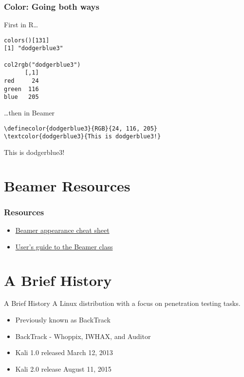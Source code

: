 \documentclass[xcolor=table]{beamer}
\begin{document}

\begin{frame}[fragile]
\frametitle{Color: Going both ways}
First in R\ldots
\begin{small}
\begin{verbatim}
colors()[131]
[1] "dodgerblue3"

col2rgb("dodgerblue3")
      [,1]
red     24
green  116
blue   205
\end{verbatim}
\end{small}
\ldots then in Beamer
\begin{small}
\begin{verbatim}
\definecolor{dodgerblue3}{RGB}{24, 116, 205}
\textcolor{dodgerblue3}{This is dodgerblue3!}
\end{verbatim}
\end{small}
\textcolor{dodgerblue3}{This is dodgerblue3!}
\end{frame}

\section{Beamer Resources}
\begin{frame}
\frametitle{Resources}
\begin{itemize}
\item \href{http://www.cpt.univ-mrs.fr/~masson/latex/Beamer-appearance-cheat-sheet.pdf}{\alert{Beamer appearance cheat sheet}}
\item \href{http://texdoc.net/texmf-dist/doc/latex/beamer/doc/beameruserguide.pdf}{\alert{User's guide to the Beamer class}}
\end{itemize}
\end{frame}


\section{A Brief History} %
\begin{frame}{A Brief History}
A Linux distribution with a focus on penetration testing tasks.
\medskip
\begin{itemize}
\item Previously known as BackTrack
\item BackTrack - Whoppix, IWHAX, and Auditor
\item Kali 1.0 released March 12, 2013
\item Kali 2.0 release August 11, 2015
\end{itemize}
\end{frame}
\end{document}

